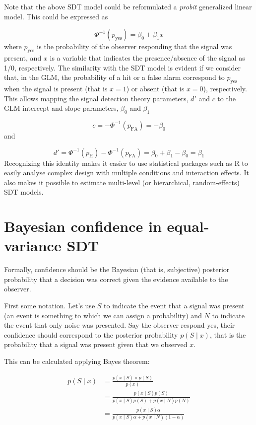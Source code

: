 \documentclass[
]{book}
\begin{document}
Note that the above SDT model could be reformulated a \emph{probit} generalized linear model. This could be expressed as

\[
\Phi^{-1}(p_{\text{yes}}) = \beta_0 + \beta_1 x
\]
where \(p_{\text{yes}}\) is the probability of the observer responding that the signal was present, and \(x\) is a variable that indicates the presence/absence of the signal as 1/0, respectively. The similarity with the SDT model is evident if we consider that, in the GLM, the probability of a hit or a false alarm correspond to \(p_{\text{yes}}\) when the signal is present (that is \(x=1\)) or absent (that is \(x=0\)), respectively. This allows mapping the signal detection theory parameters, \(d'\) and \(c\) to the GLM intercept and slope parameters, \(\beta_0\) and \(\beta_1\)

\[
c = -\Phi^{-1}(p_{\text{FA}}) = - \beta_0
\]
and

\[
d' = \Phi^{-1}(p_{\text{H}}) - \Phi^{-1}(p_{\text{FA}}) = \beta_0 + \beta_1 -\beta_0 = \beta_1
\]
Recognizing this identity makes it easier to use statistical packages such as R to easily analyse complex design with multiple conditions and interaction effects. It also makes it possible to estimate multi-level (or hierarchical, random-effects) SDT models.

\section{Bayesian confidence in equal-variance SDT}\label{bayesian-confidence-in-equal-variance-sdt}

Formally, confidence should be the Bayesian (that is, subjective) posterior probability that a decision was correct given the evidence available to the observer.

First some notation. Let's use \(S\) to indicate the event that a signal was present (an event is something to which we can assign a probability) and \(N\) to indicate the event that only noise was presented. Say the observer respond yes, their confidence should correspond to the posterior probability \(p(S\mid x)\), that is the probability that a signal was present given that we observed \(x\).

This can be calculated applying Bayes theorem:

\[
\begin{aligned}
p(S \mid x) & = \frac{p(x \mid S)\times p(S)}{p(x)} \\
& = \frac{p(x \mid S) p(S)}{p(x \mid S) p(S)+p(x \mid N) p(N)} \\
& = \frac{p(x \mid S) \alpha}{p(x \mid S) \alpha+p(x \mid N) (1-\alpha)}
\end{aligned}
\]
\end{document}
